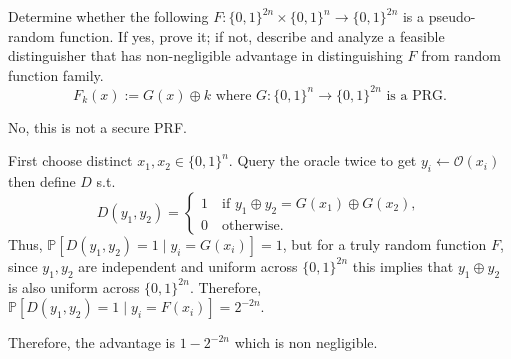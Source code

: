 \documentclass[12pt, letterpaper]{article}
\renewcommand{\P}{\mathbb{P}}
\renewcommand{\t}[1]{\text{#1}}
\begin{document}
\begin{problem}{}
    Determine whether the following $F : \{0, 1\}^{2n} \times \{0, 1\}^n \to \{0, 1\}^{2n}$ is a pseudo-
random function. If yes, prove it; if not, describe and analyze a feasible distinguisher that
has non-negligible advantage in distinguishing $F$ from random function family.
\[F_k (x) := G(x) \oplus k \t{ where } G : \{0, 1\}^n \to \{0, 1\}^{2n} \t{ is a PRG.}\]
\end{problem}
\begin{problemproof}
    No, this is not a secure PRF.

    First choose distinct $x_1,x_2 \in \{0,1\}^n$. Query the oracle twice to get $y_i \leftarrow \mathcal{O}(x_i)$ then define $D$ s.t.
    \[D(y_1,y_2) = \begin{cases}
        1 \quad \t{if } y_1 \oplus y_2 = G(x_1) \oplus G(x_2),\\
        0 \quad \t{otherwise.}
    \end{cases}\]
    Thus, $\P[D(y_1,y_2)=1 \mid y_i = G(x_i)]=1$, but for a truly random function $F$, since $y_1,y_2$ 
    are independent and uniform across $\{0,1\}^{2n}$ this implies that $y_1 \oplus y_2$ is also uniform across $\{0,1\}^{2n}$.
    Therefore, $\P[D(y_1,y_2)=1 \mid y_i = F(x_i)]=2^{-2n}$.

    Therefore, the advantage is $1-2^{-2n}$ which is non negligible.
\end{problemproof}
\end{document}
